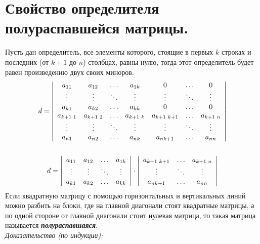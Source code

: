 \documentclass[12pt, fleqn]{article}
\begin{document}
\section{Свойство определителя полураспавшейся матрицы.}
 Пусть дан определитель, все элементы которого, стоящие в первых $k$ строках и последних (от $k+1$ до $n$) столбцах, равны нулю, тогда этот определитель будет равен произведению двух своих миноров.
\begin{multline*}
	d = \left|
	\begin{array}{ccccccc}
		a_{11} & a_{12} & \ldots & a_{1k} & 0 &\ldots & 0\\
		\vdots & \vdots & \ddots & \vdots& \vdots& \ddots&\vdots\\
		a_{k1} & a_{k2} & \ldots & a_{kk} & 0 &\ldots & 0\\
		a_{k+1\text{\space}1} & a_{k+1\text{\space}2} & \ldots & a_{k+1\text{\space}k}& a_{k+1\text{\space}k+1}&\ldots &a_{k+1\text{\space}n}\\
		\vdots & \vdots & \ddots & \vdots& \vdots& \ddots& \vdots\\
		a_{n1} & a_{n2} & \ldots & a_{nk} & a_{nk+1}&\ldots & a_{nn}  
	\end{array}
	\right|\\\\
	d =\left|
	\begin{array}{cccc}
		a_{11} & a_{12} & \ldots & a_{1k}\\
		\vdots & \vdots & \ddots & \vdots\\
		a_{k1} & a_{k2} & \ldots & a_{kk}
	\end{array}
	\right|\cdot \left|
	\begin{array}{ccc}
		a_{k+1\text{\space}k+1}&\ldots &a_{k+1\text{\space}n}\\
		\vdots & \ddots & \vdots\\
		a_{nk+1}&\ldots & a_{nn} 
	\end{array}
	\right|\\
\end{multline*}
Если квадратную матрицу с помощью горизонтальных и вертикальных линий можно разбить на блоки, где на главной диагонали стоят квадратные матрицы, а по одной стороне от главной диагонали стоит нулевая матрица, то такая матрица называется \textbf{\textit{полураспавшаяся}}.\\
\textit{Доказательство (по индукции):}
\end{document}
